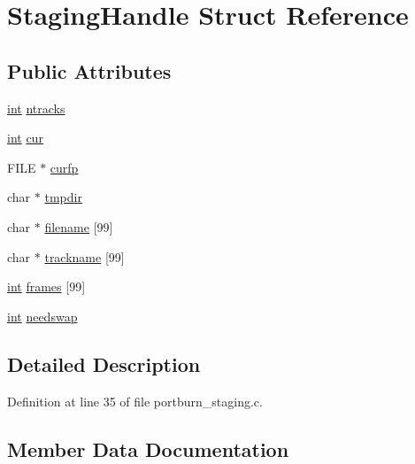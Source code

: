 \hypertarget{struct_staging_handle}{}\section{Staging\+Handle Struct Reference}
\label{struct_staging_handle}
\subsection*{Public Attributes}
\begin{DoxyCompactItemize}
\item 
\hyperlink{xmltok_8h_a5a0d4a5641ce434f1d23533f2b2e6653}{int} \hyperlink{struct_staging_handle_a81acff94a7373df51df6237155359f2a}{ntracks}
\item 
\hyperlink{xmltok_8h_a5a0d4a5641ce434f1d23533f2b2e6653}{int} \hyperlink{struct_staging_handle_a5b74fbb322efa94b93d196e462ef78d6}{cur}
\item 
F\+I\+LE $\ast$ \hyperlink{struct_staging_handle_a712692b2f7f84a1164c33e5163718001}{curfp}
\item 
char $\ast$ \hyperlink{struct_staging_handle_abcea901716e4e3651724fec56108c0d4}{tmpdir}
\item 
char $\ast$ \hyperlink{struct_staging_handle_aa6e76e28477fa7789961f45e8fb03cca}{filename} \mbox{[}99\mbox{]}
\item 
char $\ast$ \hyperlink{struct_staging_handle_a5890eb2011737b581f3aa35c1088e3bb}{trackname} \mbox{[}99\mbox{]}
\item 
\hyperlink{xmltok_8h_a5a0d4a5641ce434f1d23533f2b2e6653}{int} \hyperlink{struct_staging_handle_ab99bbdc68483ab5e022c782021c7706f}{frames} \mbox{[}99\mbox{]}
\item 
\hyperlink{xmltok_8h_a5a0d4a5641ce434f1d23533f2b2e6653}{int} \hyperlink{struct_staging_handle_a3a39e20633115543ed82aabc01bc7a86}{needswap}
\end{DoxyCompactItemize}


\subsection{Detailed Description}


Definition at line 35 of file portburn\+\_\+staging.\+c.



\subsection{Member Data Documentation}
